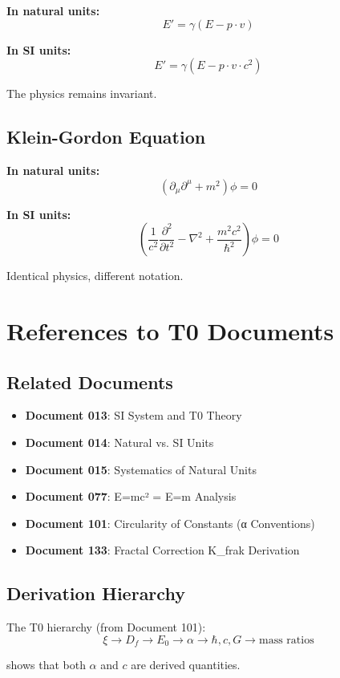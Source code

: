 	\textbf{In natural units:}
	\begin{equation}
		E' = \gamma (E - p \cdot v)
	\end{equation}
	
	\textbf{In SI units:}
	\begin{equation}
		E' = \gamma (E - p \cdot v \cdot c^2)
	\end{equation}
	
	The physics remains invariant.
	
	\subsection{Klein-Gordon Equation}
	
	\textbf{In natural units:}
	\begin{equation}
		(\partial_\mu \partial^\mu + m^2) \phi = 0
	\end{equation}
	
	\textbf{In SI units:}
	\begin{equation}
		\left(\frac{1}{c^2} \frac{\partial^2}{\partial t^2} - \nabla^2 + \frac{m^2c^2}{\hbar^2}\right) \phi = 0
	\end{equation}
	
	Identical physics, different notation.
	
	\section{References to T0 Documents}
	
	\subsection{Related Documents}
	
	\begin{itemize}
		\item \textbf{Document 013}: SI System and T0 Theory \\

		\item \textbf{Document 014}: Natural vs. SI Units \\

		\item \textbf{Document 015}: Systematics of Natural Units \\

		\item \textbf{Document 077}: E=mc² = E=m Analysis \\

		\item \textbf{Document 101}: Circularity of Constants (α Conventions) \\

		\item \textbf{Document 133}: Fractal Correction K\_frak Derivation \\
		
	\end{itemize}
	
	\subsection{Derivation Hierarchy}
	
	The T0 hierarchy (from Document 101):
	\begin{equation}
		\xi \to D_f \to E_0 \to \alpha \to \hbar, c, G \to \text{mass ratios}
	\end{equation}
	
	shows that both $\alpha$ and $c$ are derived quantities.
